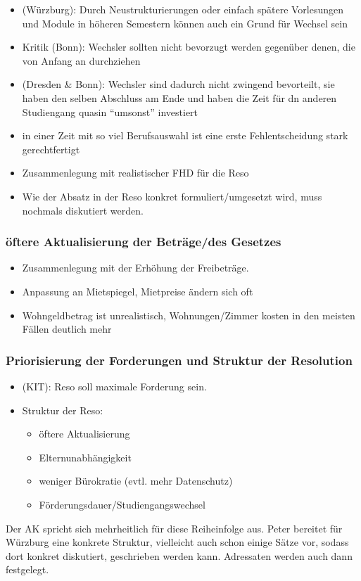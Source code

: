 \begin{itemize}
        \item (Würzburg): Durch Neustrukturierungen oder einfach spätere Vorlesungen und Module in höheren Semestern können auch ein Grund für Wechsel sein
        \item Kritik (Bonn): Wechsler sollten nicht bevorzugt werden gegenüber denen, die von Anfang an durchziehen
        \item (Dresden \& Bonn): Wechsler sind dadurch nicht zwingend bevorteilt, sie haben den selben Abschluss am Ende und haben die Zeit für dn anderen Studiengang quasin “umsonst” investiert
        \item in einer Zeit mit so viel Berufsauswahl ist eine erste Fehlentscheidung stark gerechtfertigt
        \item Zusammenlegung mit realistischer FHD für die Reso
        \item Wie der Absatz in der Reso konkret formuliert/umgesetzt wird, muss nochmals diskutiert werden.
      \end{itemize}

    \subsubsection{öftere Aktualisierung der Beträge/des Gesetzes}
      \begin{itemize}
        \item Zusammenlegung mit der Erhöhung der Freibeträge.
        \item Anpassung an Mietspiegel, Mietpreise ändern sich oft
        \item Wohngeldbetrag ist unrealistisch, Wohnungen/Zimmer kosten in den meisten Fällen deutlich mehr
      \end{itemize}

    \subsubsection{Priorisierung der Forderungen und Struktur der Resolution}
      \begin{itemize}
        \item (KIT): Reso soll maximale Forderung sein.
        \item Struktur der Reso:
          \begin{itemize}
            \item öftere Aktualisierung
            \item Elternunabhängigkeit
            \item weniger Bürokratie (evtl. mehr Datenschutz)
            \item Förderungsdauer/Studiengangswechsel
          \end{itemize}
      \end{itemize}

Der AK spricht sich mehrheitlich für diese Reiheinfolge aus.
Peter bereitet für Würzburg eine konkrete Struktur, vielleicht auch schon einige Sätze vor, sodass dort konkret diskutiert, geschrieben werden kann. Adressaten werden auch dann festgelegt.
